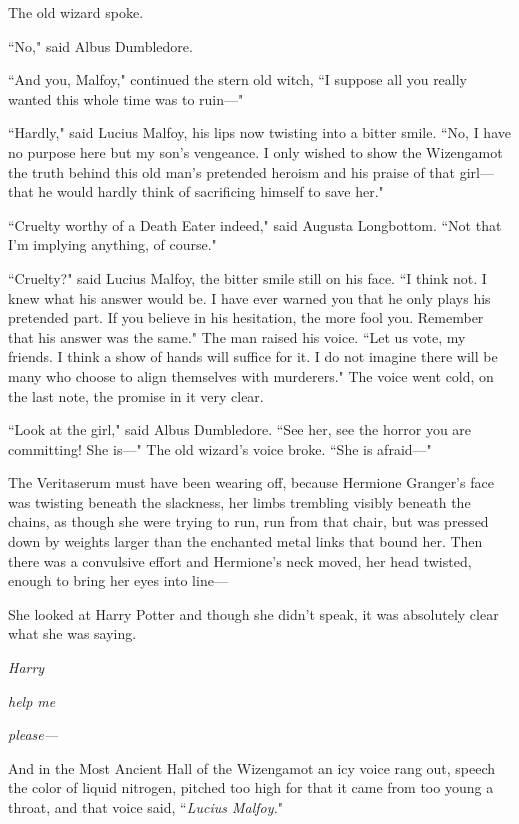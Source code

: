 The old wizard spoke.

``No," said Albus Dumbledore.

``And you, Malfoy," continued the stern old witch, ``I suppose all you really wanted this whole time was to ruin—"

``Hardly," said Lucius Malfoy, his lips now twisting into a bitter smile. ``No, I have no purpose here but my son's vengeance. I only wished to show the Wizengamot the truth behind this old man's pretended heroism and his praise of that girl—that he would hardly think of sacrificing himself to save her."

``Cruelty worthy of a Death Eater indeed," said Augusta Longbottom. ``Not that I'm implying anything, of course."

``Cruelty?" said Lucius Malfoy, the bitter smile still on his face. ``I think not. I knew what his answer would be. I have ever warned you that he only plays his pretended part. If you believe in his hesitation, the more fool you. Remember that his answer was the same." The man raised his voice. ``Let us vote, my friends. I think a show of hands will suffice for it. I do not imagine there will be many who choose to align themselves with murderers." The voice went cold, on the last note, the promise in it very clear.

``Look at the girl," said Albus Dumbledore. ``See her, see the horror you are committing! She is—" The old wizard's voice broke. ``She is afraid—"

The Veritaserum must have been wearing off, because Hermione Granger's face was twisting beneath the slackness, her limbs trembling visibly beneath the chains, as though she were trying to run, run from that chair, but was pressed down by weights larger than the enchanted metal links that bound her. Then there was a convulsive effort and Hermione's neck moved, her head twisted, enough to bring her eyes into line—

She looked at Harry Potter and though she didn't speak, it was absolutely clear what she was saying.

\emph{Harry}

\emph{help me}

\emph{please—}

And in the Most Ancient Hall of the Wizengamot an icy voice rang out, speech the color of liquid nitrogen, pitched too high for that it came from too young a throat, and that voice said, ``\emph{Lucius Malfoy.}"

\later

